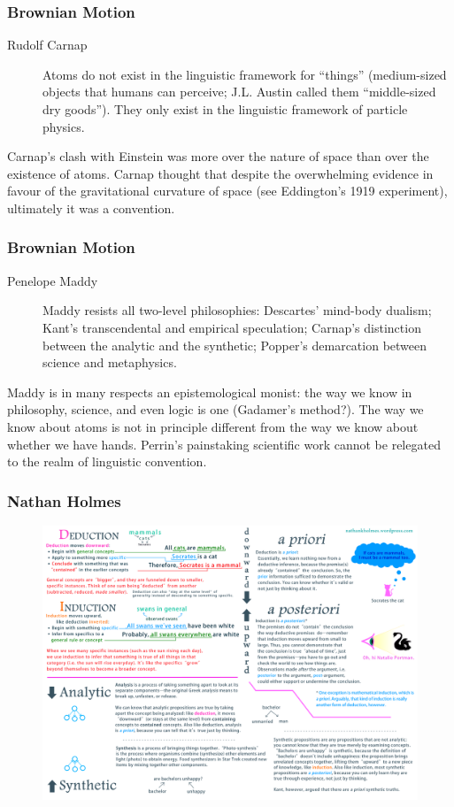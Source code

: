 \documentclass[xcolor=dvipsnames]{beamer}
\begin{document}
\begin{frame}
  \frametitle{Brownian Motion}
  \begin{description}
  \item[Rudolf Carnap] Atoms do not exist in the linguistic framework
    for ``things'' (medium-sized objects that humans can perceive; J.L.
    Austin called them ``middle-sized dry goods''). They only exist in
    the linguistic framework of particle physics.
  \end{description}
  Carnap's clash with Einstein was more over the nature of space than
  over the existence of atoms. Carnap thought that despite the
  overwhelming evidence in favour of the gravitational curvature of
  space (see Eddington's 1919 experiment), ultimately it was a
  convention.
\end{frame}

\begin{frame}
  \frametitle{Brownian Motion}
  \begin{description}
  \item[Penelope Maddy] Maddy resists all two-level philosophies:
    Descartes' mind-body dualism; Kant's transcendental and empirical
    speculation; Carnap's distinction between the analytic and the
    synthetic; Popper's demarcation between science and metaphysics.
  \end{description}
  Maddy is in many respects an epistemological monist: the way we know
  in philosophy, science, and even logic is one (Gadamer's method?).
  The way we know about atoms is not in principle different from the
  way we know about whether we have hands. Perrin's painstaking
  scientific work cannot be relegated to the realm of linguistic
  convention.
\end{frame}

\begin{frame}
  \frametitle{Nathan Holmes}
  \begin{figure}[h]
    \includegraphics[scale=0.14]{./nathanholmes.png}
  \end{figure}
\end{frame}
\end{document}

